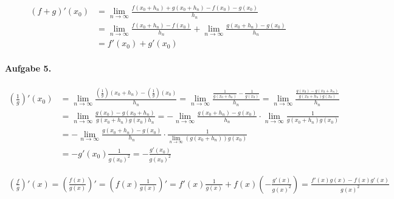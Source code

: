 \documentclass{article}
\begin{document}
\begin{align*}
    (f + g)'(x_0) &= \lim_{n \to \infty} \frac{f(x_0 + h_n) + g(x_0 + h_n) - f(x_0) - g(x_0)}{h_n} \\
    &= \lim_{n \to \infty} \frac{f(x_0 + h_n) - f(x_0)}{h_n} + \lim_{n \to \infty} \frac{g(x_0 + h_n) - g(x_0)}{h_n} \\
    &= f'(x_0) + g'(x_0)
\end{align*}

\paragraph{Aufgabe 5.}

\begin{align*}
    \left(\frac{1}{g}\right)'(x_0) &= \lim_{n \to \infty} \frac{\left(\frac{1}{g}\right)(x_0 + h_n) - \left(\frac{1}{g}\right)(x_0)}{h_n} = \lim_{n \to \infty} \frac{\frac{1}{g(x_0 + h_n)} - \frac{1}{g(x_0)}}{h_n} = \lim_{n \to \infty} \frac{\frac{g(x_0) - g(x_0 + h_n)}{g(x_0 + h_n)g(x_0)}}{h_n} \\
    &= \lim_{n \to \infty} \frac{g(x_0) - g(x_0 + h_n)}{g(x_0 + h_n)g(x_0)h_n} = -\lim_{n \to \infty} \frac{g(x_0 + h_n) - g(x_0)}{h_n} \cdot \lim_{n \to \infty} \frac{1}{g(x_0 + h_n)g(x_0)} \\
    &= -\lim_{n \to \infty} \frac{g(x_0 + h_n) - g(x_0)}{h_n} \cdot \frac{1}{\lim_{n \to \infty}(g(x_0 + h_n))g(x_0)} \\
    &= -g'(x_0) \frac{1}{g(x_0)^2} = -\frac{g'(x_0)}{g(x_0)^2}
\end{align*}

\begin{align*}
    \left(\frac{f}{g}\right)'(x) = \left(\frac{f(x)}{g(x)}\right)' = \left(f(x)\frac{1}{g(x)}\right)' = f'(x)\frac{1}{g(x)}+f(x)\left(-\frac{g'(x)}{g(x)^2}\right) = \frac{f'(x)g(x) - f(x)g'(x)}{g(x)^2}
\end{align*}
\end{document}
